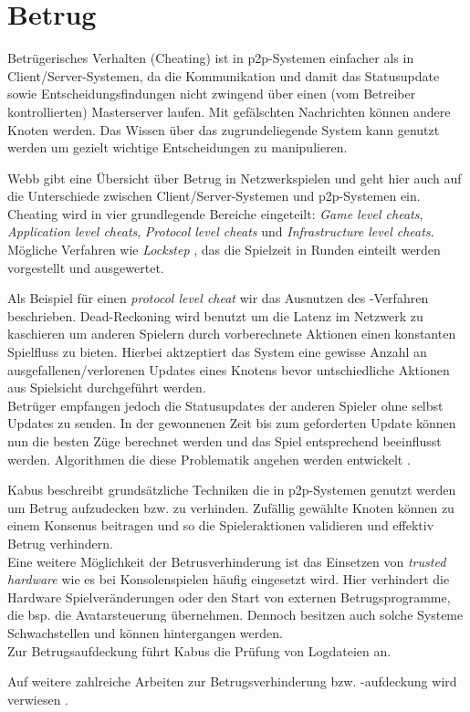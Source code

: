 \section{Betrug}
\label{chap:grundlagen:cheating}
Betrügerisches Verhalten (Cheating) ist in p2p-Systemen einfacher als in Client/Server-Systemen, da die Kommunikation und damit das Statusupdate sowie Entscheidungsfindungen nicht zwingend über einen (vom Betreiber kontrollierten) Masterserver laufen. Mit gefälschten Nachrichten können andere Knoten werden. Das Wissen über das zugrundeliegende System kann genutzt werden um gezielt wichtige Entscheidungen zu manipulieren.

Webb \cite{Webb2007Cheating} gibt eine Übersicht über Betrug in Netzwerkspielen und geht hier auch auf die Unterschiede zwischen Client/Server-Systemen und p2p-Systemen ein. Cheating wird in vier grundlegende Bereiche eingeteilt: \emph{Game level cheats}, \emph{Application level cheats}, \emph{Protocol level cheats} und \emph{Infrastructure level cheats}. Mögliche Verfahren wie \emph{Lockstep} \cite{Baughman2007}, das die Spielzeit in Runden einteilt werden vorgestellt und ausgewertet.

Als Beispiel für einen \emph{protocol level cheat} wir das Ausnutzen des \emph{}-Verfahren \cite{Pantel2002} beschrieben. Dead-Reckoning wird benutzt um die Latenz im Netzwerk zu kaschieren um anderen Spielern durch vorberechnete Aktionen einen konstanten Spielfluss zu bieten. Hierbei aktzeptiert das System eine gewisse Anzahl an ausgefallenen/verlorenen Updates eines Knotens bevor untschiedliche Aktionen aus Spielsicht durchgeführt werden.\\
Betrüger empfangen jedoch die Statusupdates der anderen Spieler ohne selbst Updates zu senden. In der gewonnenen Zeit bis zum geforderten Update können nun die besten Züge berechnet werden und das Spiel entsprechend beeinflusst werden. Algorithmen die diese Problematik angehen werden entwickelt \cite{Aggarwal2005}.

Kabus \cite{Kabus2005Addressing} beschreibt grundsätzliche Techniken die in p2p-Systemen genutzt werden um Betrug aufzudecken bzw. zu verhinden. Zufällig gewählte Knoten können zu einem Konsenus beitragen und so die Spieleraktionen validieren und effektiv Betrug verhindern.\\
Eine weitere Möglichkeit der Betrusverhinderung ist das Einsetzen von \emph{trusted hardware} wie es bei Konsolenspielen häufig eingesetzt wird. Hier verhindert die Hardware Spielveränderungen oder den Start von externen Betrugsprogramme, die bsp. die Avatarsteuerung übernehmen. Dennoch besitzen auch solche Systeme Schwachstellen und können hintergangen werden.\\
Zur Betrugsaufdeckung führt Kabus die Prüfung von Logdateien an.

Auf weitere zahlreiche Arbeiten zur Betrugsverhinderung bzw. -aufdeckung wird verwiesen \cite{Ferretti2008Cheating, Gauthierdickey2004Low, Kabus2007Design}.
